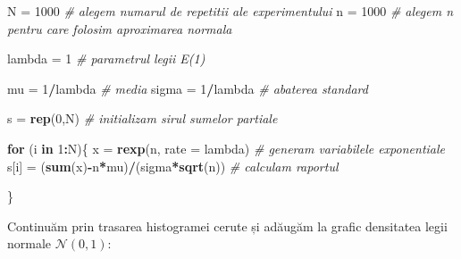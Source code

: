 \documentclass[
]{article}
\newenvironment{Shaded}{\begin{snugshade}}{\end{snugshade}}
\newcommand{\CommentTok}[1]{\textcolor[rgb]{0.56,0.35,0.01}{\textit{#1}}}
\newcommand{\ControlFlowTok}[1]{\textcolor[rgb]{0.13,0.29,0.53}{\textbf{#1}}}
\newcommand{\DataTypeTok}[1]{\textcolor[rgb]{0.13,0.29,0.53}{#1}}
\newcommand{\DecValTok}[1]{\textcolor[rgb]{0.00,0.00,0.81}{#1}}
\newcommand{\KeywordTok}[1]{\textcolor[rgb]{0.13,0.29,0.53}{\textbf{#1}}}
\newcommand{\NormalTok}[1]{#1}
\newcommand{\OperatorTok}[1]{\textcolor[rgb]{0.81,0.36,0.00}{\textbf{#1}}}
\newcommand{\StringTok}[1]{\textcolor[rgb]{0.31,0.60,0.02}{#1}}
\begin{document}
\begin{Shaded}
\begin{Highlighting}[]
\NormalTok{N =}\StringTok{ }\DecValTok{1000} \CommentTok{# alegem numarul de repetitii ale experimentului}
\NormalTok{n =}\StringTok{ }\DecValTok{1000} \CommentTok{# alegem n pentru care folosim aproximarea normala}

\NormalTok{lambda =}\StringTok{ }\DecValTok{1} \CommentTok{# parametrul legii E(1)}

\NormalTok{mu =}\StringTok{ }\DecValTok{1}\OperatorTok{/}\NormalTok{lambda }\CommentTok{# media}
\NormalTok{sigma =}\StringTok{ }\DecValTok{1}\OperatorTok{/}\NormalTok{lambda }\CommentTok{# abaterea standard }

\NormalTok{s =}\StringTok{ }\KeywordTok{rep}\NormalTok{(}\DecValTok{0}\NormalTok{,N) }\CommentTok{# initializam sirul sumelor partiale}

\ControlFlowTok{for}\NormalTok{ (i }\ControlFlowTok{in} \DecValTok{1}\OperatorTok{:}\NormalTok{N)\{}
\NormalTok{  x =}\StringTok{ }\KeywordTok{rexp}\NormalTok{(n, }\DataTypeTok{rate =}\NormalTok{ lambda) }\CommentTok{# generam variabilele exponentiale}
\NormalTok{  s[i] =}\StringTok{ }\NormalTok{(}\KeywordTok{sum}\NormalTok{(x)}\OperatorTok{-}\NormalTok{n}\OperatorTok{*}\NormalTok{mu)}\OperatorTok{/}\NormalTok{(sigma}\OperatorTok{*}\KeywordTok{sqrt}\NormalTok{(n)) }\CommentTok{# calculam raportul }
  
\NormalTok{\}}
\end{Highlighting}
\end{Shaded}

Continuăm prin trasarea histogramei cerute și adăugăm la grafic
densitatea legii normale \(\mathcal{N}(0,1)\):
\end{document}
